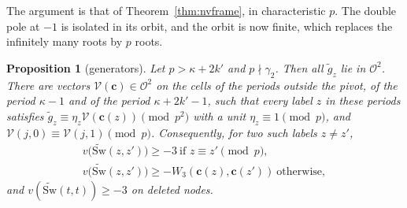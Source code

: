\documentclass[11pt]{amsart}
\newtheorem{proposition}[theorem]{Proposition}
\theoremstyle{definition}
\theoremstyle{remark}
\numberwithin{equation}{section}
\newcommand{\cO}{\mathcal O}
\begin{document}
The argument is that of Theorem~\ref{thm:nvframe}, in characteristic $p$. The double pole at $-1$ is isolated in its
orbit, and the orbit is now finite, which replaces the infinitely many roots by $p$ roots.

\begin{proposition}[generators]\label{prop:gen}
Let $p>\kappa+2k'$ and $p\nmid\gamma_2$. Then all $\tilde g_z$ lie in $\cO^2$. There are vectors
$\mathcal V(\mathbf c)\in\cO^2$ on the cells of the periods outside the pivot, of the period $\kappa-1$ and of the period
$\kappa+2k'-1$, such that every label $z$ in these periods satisfies
$\tilde g_z\equiv\eta_z\mathcal V(\mathbf c(z))\pmod{p^2}$ with a unit $\eta_z\equiv1\pmod p$, and
$\mathcal V(j,0)\equiv\mathcal V(j,1)\pmod p$. Consequently, for two such labels $z\ne z'$,
\begin{gather*}
 v\bigl(\widetilde{\mathrm{Sw}}(z,z')\bigr)\ge-3\ \text{if }z\equiv z'\pmod p,\\
 v\bigl(\widetilde{\mathrm{Sw}}(z,z')\bigr)\ge-W_3(\mathbf c(z),\mathbf c(z'))\ \text{otherwise},
\end{gather*}
and $v(\widetilde{\mathrm{Sw}}(t,t))\ge-3$ on deleted nodes.
\end{proposition}
\end{document}
